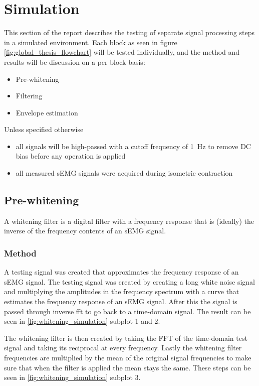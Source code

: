 \chapter{Simulation}
This section of the report describes the testing of separate signal processing steps in a simulated environment. Each block as seen in figure \ref{fig:global_thesis_flowchart} will be tested individually, and the method and results will be discussion on a per-block basis:
\begin{itemize}
    \item Pre-whitening
    \item Filtering
    \item Envelope estimation
\end{itemize}

Unless specified otherwise
\begin{itemize}
    \item all signals will be high-passed with a cutoff frequency of \SI{1}{\hertz} to remove DC bias before any operation is applied
    \item all measured sEMG signals were acquired during isometric contraction
\end{itemize}

\section{Pre-whitening}
A whitening filter is a digital filter with a frequency response that is (ideally) the inverse of the frequency contents of an sEMG signal. 

\subsection{Method}
A testing signal was created that approximates the frequency response of an sEMG signal. The testing signal was created by creating a long white noise signal and multiplying the amplitudes in the frequency spectrum with a curve that estimates the frequency response of an sEMG signal. After this the signal is passed through inverse fft to go back to a time-domain signal. The result can be seen in \ref{fig:whitening_simulation} subplot 1 and 2.

The whitening filter is then created by taking the FFT of the time-domain test signal and taking its reciprocal at every frequency. Lastly the whitening filter frequencies are multiplied by the mean of the original signal frequencies to make sure that when the filter is applied the mean stays the same. These steps can be seen in \ref{fig:whitening_simulation} subplot 3. 


